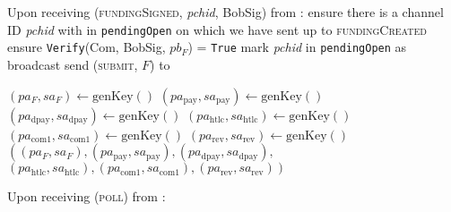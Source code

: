 \begin{algorithmic}[1]
    \State Upon receiving (\textsc{fundingSigned}, \textit{pchid}, BobSig) from
    \bob:
    \Indent
      \State ensure there is a channel ID \textit{pchid} with \bob{} in
      \texttt{pendingOpen} on which we have sent up to \textsc{fundingCreated}
      \State ensure \texttt{Verify}(Com, BobSig, $pb_F$) = \texttt{True}
      \State mark \textit{pchid} in \texttt{pendingOpen} as broadcast
      \State send (\textsc{submit}, $F$) to \ledger
    \EndIndent
    \State

     
      \State $\left(pa_F, sa_F\right) \gets \mathrm{genKey}\left(\right)$
      \State $\left(pa_{\mathrm{pay}}, sa_{\mathrm{pay}}\right) \gets
      \mathrm{genKey}\left(\right)$ 
      \State $\left(pa_{\mathrm{dpay}}, sa_{\mathrm{dpay}}\right) \gets
      \mathrm{genKey}\left(\right)$ 
      \State $\left(pa_{\mathrm{htlc}}, sa_{\mathrm{htlc}}\right) \gets
      \mathrm{genKey}\left(\right)$ 
      \State $\left(pa_{\mathrm{com}1}, sa_{\mathrm{com}1}\right) \gets
      \mathrm{genKey}\left(\right)$ 
      \State $\left(pa_{\mathrm{rev}}, sa_{\mathrm{rev}}\right) \gets
      \mathrm{genKey}\left(\right)$ 
      \State \Return $\left(\left(pa_F, sa_F\right), \left(pa_{\mathrm{pay}},
      sa_{\mathrm{pay}}\right), \left(pa_{\mathrm{dpay}},
      sa_{\mathrm{dpay}}\right),\right.$
      \Indent
        \State $\left.\left(pa_{\mathrm{htlc}}, sa_{\mathrm{htlc}}\right),
        \left(pa_{\mathrm{com}1}, sa_{\mathrm{com}1}\right),
        \left(pa_{\mathrm{rev}}, sa_{\mathrm{rev}}\right)\right)$
      \EndIndent
    \EndFunction
    \State

    \State Upon receiving (\textsc{poll}) from \environment: 
    \Indent
      \State
    \EndIndent
    \State


\end{algorithmic}
